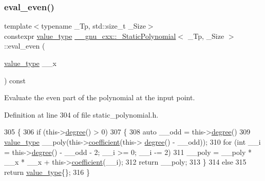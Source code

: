 \subsubsection{\texorpdfstring{eval\+\_\+even()}{eval\_even()}\hspace{0.1cm}{\footnotesize\ttfamily [1/2]}}
{\footnotesize\ttfamily template$<$typename \+\_\+\+Tp, std\+::size\+\_\+t \+\_\+\+Size$>$ \\
constexpr \hyperlink{class____gnu__cxx_1_1__StaticPolynomial_aad5f3d6d5876b6926b30724aeac649d6}{value\+\_\+type} \hyperlink{class____gnu__cxx_1_1__StaticPolynomial}{\+\_\+\+\_\+gnu\+\_\+cxx\+::\+\_\+\+Static\+Polynomial}$<$ \+\_\+\+Tp, \+\_\+\+Size $>$\+::eval\+\_\+even (\begin{DoxyParamCaption}\item[{\hyperlink{class____gnu__cxx_1_1__StaticPolynomial_aad5f3d6d5876b6926b30724aeac649d6}{value\+\_\+type}}]{\+\_\+\+\_\+x }\end{DoxyParamCaption}) const\hspace{0.3cm}{\ttfamily [inline]}}

Evaluate the even part of the polynomial at the input point. 

Definition at line 304 of file static\+\_\+polynomial.\+h.


\begin{DoxyCode}
305       \{
306         \textcolor{keywordflow}{if} (this->\hyperlink{class____gnu__cxx_1_1__StaticPolynomial_a5977dac3a84e8a43f3e9da28b62ca46a}{degree}() > 0)
307           \{
308             \textcolor{keyword}{auto} \_\_odd = this->\hyperlink{class____gnu__cxx_1_1__StaticPolynomial_a5977dac3a84e8a43f3e9da28b62ca46a}{degree}() %
309             \hyperlink{class____gnu__cxx_1_1__StaticPolynomial_aad5f3d6d5876b6926b30724aeac649d6}{value\_type} \_\_poly(this->\hyperlink{class____gnu__cxx_1_1__StaticPolynomial_a74535a3f8f586223097b30891bc1402b}{coefficient}(this->
      \hyperlink{class____gnu__cxx_1_1__StaticPolynomial_a5977dac3a84e8a43f3e9da28b62ca46a}{degree}() - \_\_odd));
310             \textcolor{keywordflow}{for} (\textcolor{keywordtype}{int} \_\_i = this->\hyperlink{class____gnu__cxx_1_1__StaticPolynomial_a5977dac3a84e8a43f3e9da28b62ca46a}{degree}() - \_\_odd - 2; \_\_i >= 0; \_\_i -= 2)
311               \_\_poly = \_\_poly * \_\_x * \_\_x + this->\hyperlink{class____gnu__cxx_1_1__StaticPolynomial_a74535a3f8f586223097b30891bc1402b}{coefficient}(\_\_i);
312             \textcolor{keywordflow}{return} \_\_poly;
313           \}
314         \textcolor{keywordflow}{else}
315           \textcolor{keywordflow}{return} \hyperlink{class____gnu__cxx_1_1__StaticPolynomial_aad5f3d6d5876b6926b30724aeac649d6}{value\_type}\{\};
316       \}
\end{DoxyCode}
\mbox{\label{class____gnu__cxx_1_1__StaticPolynomial_a2afdbee7c52c81ad10d8c6657352ec13}} 
